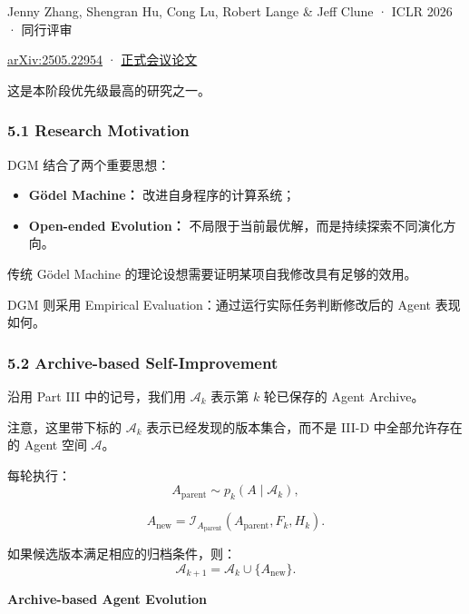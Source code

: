 Jenny Zhang, Shengran Hu, Cong Lu, Robert Lange \& Jeff Clune · ICLR 2026 · 同行评审

\href{https://arxiv.org/abs/2505.22954}{arXiv:2505.22954} · \href{https://openreview.net/pdf?id=pUpzQZTvGY}{正式会议论文}

这是本阶段优先级最高的研究之一。

\hypertarget{part-3-44-0001-research-motivation-1}{%
\subsubsection{5.1 Research Motivation}\label{part-3-44-0001-research-motivation-1}}

DGM 结合了两个重要思想：

\begin{itemize}
\tightlist
\item
  \textbf{Gödel Machine：} 改进自身程序的计算系统；
\item
  \textbf{Open-ended Evolution：} 不局限于当前最优解，而是持续探索不同演化方向。
\end{itemize}

传统 Gödel Machine 的理论设想需要证明某项自我修改具有足够的效用。

DGM 则采用 Empirical Evaluation：通过运行实际任务判断修改后的 Agent 表现如何。

\hypertarget{part-3-44-0001-archive-based-self-improvement}{%
\subsubsection{5.2 Archive-based Self-Improvement}\label{part-3-44-0001-archive-based-self-improvement}}

沿用 Part III 中的记号，我们用 \(\mathcal A_k\) 表示第 \(k\) 轮已保存的 Agent Archive。

注意，这里带下标的 \(\mathcal A_k\) 表示已经发现的版本集合，而不是 III-D 中全部允许存在的 Agent 空间 \(\mathcal A\)。

每轮执行：
\[A_{\mathrm{parent}}
\sim
p_k(A\mid\mathcal A_k),\]

\[A_{\mathrm{new}}
=
\mathcal I_{A_{\mathrm{parent}}}
(A_{\mathrm{parent}},F_k,H_k).\]

如果候选版本满足相应的归档条件，则：
\[\mathcal A_{k+1}
=
\mathcal A_k\cup\{A_{\mathrm{new}}\}.\]

\textbf{Archive-based Agent Evolution}


